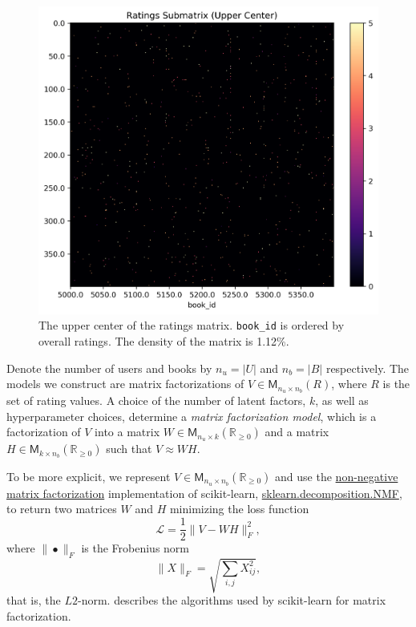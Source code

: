 \documentclass[11pt]{article}
\begin{document}
\begin{figure}
    \centering
    \includegraphics[width=\linewidth]{../image/goodreads-models/ratings-submatrix-upper-center.png}
    \caption[Ratings Submatrix (Center)]{The upper center of the ratings matrix. \texttt{book\_id} is ordered by overall ratings. The density of the matrix is 1.12\%.}
     \label{fig:ratings-submatrix-upper-left-center}
\end{figure}



    Denote the number of users and books by \(n_u = |U|\) and \(n_b = |B|\)
respectively. The models we construct are matrix factorizations of
\(V \in \mathsf{M}_{n_u \times n_b} (R)\), where \(R\) is the set of
rating values. A choice of the number of latent factors, \(k\), as well
as hyperparameter choices, determine a \emph{matrix factorization
model}, which is a factorization of \(V\) into a matrix
\(W \in \mathsf{M}_{n_u \times k} (\mathbb{R}_{\geq 0})\) and a matrix
\(H \in \mathsf{M}_{k \times n_b} (\mathbb{R}_{\geq 0})\) such that
\(V \approx WH\).

    To be more explicit, we represent
\(V \in \mathsf{M}_{n_u \times n_b} (\mathbb{R}_{\geq 0})\) and use the
\href{https://scikit-learn.org/stable/modules/decomposition.html\#non-negative-matrix-factorization-nmf-or-nnmf}{non-negative
matrix factorization} implementation of scikit-learn,
\href{https://scikit-learn.org/stable/modules/generated/sklearn.decomposition.NMF.html}{sklearn.decomposition.NMF},
to return two matrices \(W\) and \(H\) minimizing the loss function 
\begin{equation} \label{eq:loss-fcn}
\mathcal{L} = \frac{1}{2} \| V - WH \|_F^2,
\end{equation}
where \(\| \bullet \|_F\) is the Frobenius norm \[
\| X \|_F = \sqrt{ \sum_{i, j} X_{ij}^2},
\] that is, the \(L2\)-norm.
\cite{leeAlgorithmsNonnegativeMatrix2001} describes the algorithms used by scikit-learn for matrix
factorization.
\end{document}
